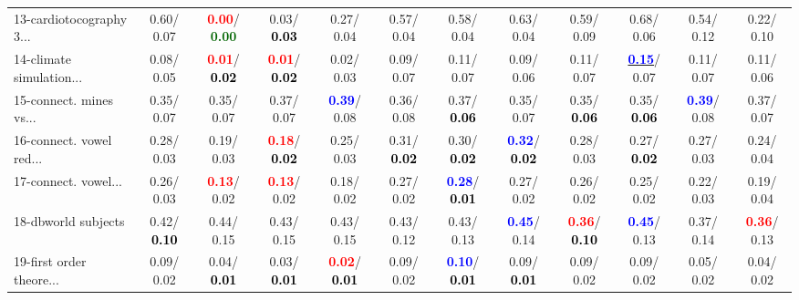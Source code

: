 \begin{table}[h]
\begin{center}
{\begin{tabular}{lc|c|c|c|c|c|c|c|c|c|c}
13-cardiotocography 3... &   0.60/  0.07 & \textcolor{red}{\textbf{  0.00}}/\textcolor{darkgreen}{\textbf{  0.00}} &   0.03/\textcolor{black}{\textbf{  0.03}} &   0.27/  0.04 &   0.57/  0.04 &   0.58/  0.04 &   0.63/  0.04 &   0.59/  0.09 &   0.68/  0.06 &   0.54/  0.12 &   0.22/  0.10 \\
14-climate simulation... &   0.08/  0.05 & \textcolor{red}{\textbf{  0.01}}/\textcolor{black}{\textbf{  0.02}} & \textcolor{red}{\textbf{  0.01}}/\textcolor{black}{\textbf{  0.02}} &   0.02/  0.03 &   0.09/  0.07 &   0.11/  0.07 &   0.09/  0.06 &   0.11/  0.07 & \underline{\textcolor{blue}{\textbf{  0.15}}}/  0.07 &   0.11/  0.07 &   0.11/  0.06 \\ \hline
15-connect. mines vs... &   0.35/  0.07 &   0.35/  0.07 &   0.37/  0.07 & \textcolor{blue}{\textbf{  0.39}}/  0.08 &   0.36/  0.08 &   0.37/\textcolor{black}{\textbf{  0.06}} &   0.35/  0.07 &   0.35/\textcolor{black}{\textbf{  0.06}} &   0.35/\textcolor{black}{\textbf{  0.06}} & \textcolor{blue}{\textbf{  0.39}}/  0.08 &   0.37/  0.07 \\
16-connect. vowel red... &   0.28/  0.03 &   0.19/  0.03 & \textcolor{red}{\textbf{  0.18}}/\textcolor{black}{\textbf{  0.02}} &   0.25/  0.03 &   0.31/\textcolor{black}{\textbf{  0.02}} &   0.30/\textcolor{black}{\textbf{  0.02}} & \textcolor{blue}{\textbf{  0.32}}/\textcolor{black}{\textbf{  0.02}} &   0.28/  0.03 &   0.27/\textcolor{black}{\textbf{  0.02}} &   0.27/  0.03 &   0.24/  0.04 \\
17-connect. vowel... &   0.26/  0.03 & \textcolor{red}{\textbf{  0.13}}/  0.02 & \textcolor{red}{\textbf{  0.13}}/  0.02 &   0.18/  0.02 &   0.27/  0.02 & \textcolor{blue}{\textbf{  0.28}}/\textcolor{black}{\textbf{  0.01}} &   0.27/  0.02 &   0.26/  0.02 &   0.25/  0.02 &   0.22/  0.03 &   0.19/  0.04 \\
18-dbworld subjects &   0.42/\textcolor{black}{\textbf{  0.10}} &   0.44/  0.15 &   0.43/  0.15 &   0.43/  0.15 &   0.43/  0.12 &   0.43/  0.13 & \textcolor{blue}{\textbf{  0.45}}/  0.14 & \textcolor{red}{\textbf{  0.36}}/\textcolor{black}{\textbf{  0.10}} & \textcolor{blue}{\textbf{  0.45}}/  0.13 &   0.37/  0.14 & \textcolor{red}{\textbf{  0.36}}/  0.13 \\
19-first order theore... &   0.09/  0.02 &   0.04/\textcolor{black}{\textbf{  0.01}} &   0.03/\textcolor{black}{\textbf{  0.01}} & \textcolor{red}{\textbf{  0.02}}/\textcolor{black}{\textbf{  0.01}} &   0.09/  0.02 & \textcolor{blue}{\textbf{  0.10}}/\textcolor{black}{\textbf{  0.01}} &   0.09/\textcolor{black}{\textbf{  0.01}} &   0.09/  0.02 &   0.09/  0.02 &   0.05/  0.02 &   0.04/  0.02 \\

\end{tabular}}
\end{center}
\end{table}
